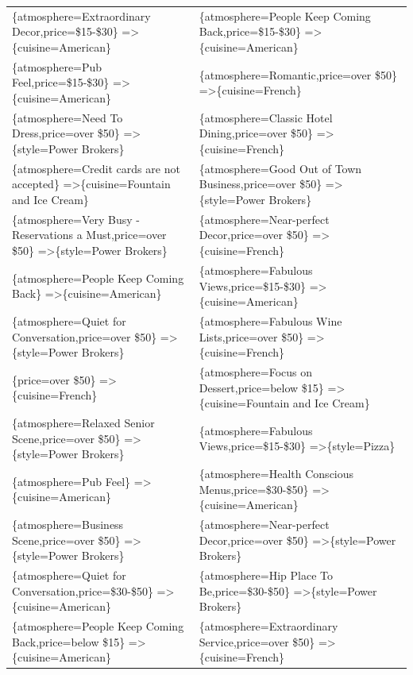 \documentclass[letterpaper,10pt]{article}
\begin{document}
\begin{appendices}
\begin{table}[h]
\begin{adjustbox}{max width=\textwidth}
\begin{tabular}{ll}
\{atmosphere=Extraordinary Decor,price=\$15-\$30\} =\textgreater \{cuisine=American\} & \{atmosphere=People Keep Coming Back,price=\$15-\$30\} =\textgreater \{cuisine=American\} \\ 
\{atmosphere=Pub Feel,price=\$15-\$30\} =\textgreater \{cuisine=American\} & \{atmosphere=Romantic,price=over \$50\} =\textgreater \{cuisine=French\} \\ 
\{atmosphere=Need To Dress,price=over \$50\} =\textgreater \{style=Power Brokers\} & \{atmosphere=Classic Hotel Dining,price=over \$50\} =\textgreater \{cuisine=French\} \\ 
\{atmosphere=Credit cards are not accepted\} =\textgreater \{cuisine=Fountain and Ice Cream\} & \{atmosphere=Good Out of Town Business,price=over \$50\} =\textgreater \{style=Power Brokers\} \\ 
\{atmosphere=Very Busy - Reservations a Must,price=over \$50\} =\textgreater \{style=Power Brokers\} & \{atmosphere=Near-perfect Decor,price=over \$50\} =\textgreater \{cuisine=French\} \\ 
\{atmosphere=People Keep Coming Back\} =\textgreater \{cuisine=American\} & \{atmosphere=Fabulous Views,price=\$15-\$30\} =\textgreater \{cuisine=American\} \\ 
\{atmosphere=Quiet for Conversation,price=over \$50\} =\textgreater \{style=Power Brokers\} & \{atmosphere=Fabulous Wine Lists,price=over \$50\} =\textgreater \{cuisine=French\} \\ 
\{price=over \$50\} =\textgreater \{cuisine=French\} & \{atmosphere=Focus on Dessert,price=below \$15\} =\textgreater \{cuisine=Fountain and Ice Cream\} \\ 
\{atmosphere=Relaxed Senior Scene,price=over \$50\} =\textgreater \{style=Power Brokers\} & \{atmosphere=Fabulous Views,price=\$15-\$30\} =\textgreater \{style=Pizza\} \\ 
\{atmosphere=Pub Feel\} =\textgreater \{cuisine=American\} & \{atmosphere=Health Conscious Menus,price=\$30-\$50\} =\textgreater \{cuisine=American\} \\ 
\{atmosphere=Business Scene,price=over \$50\} =\textgreater \{style=Power Brokers\} & \{atmosphere=Near-perfect Decor,price=over \$50\} =\textgreater \{style=Power Brokers\} \\ 
\{atmosphere=Quiet for Conversation,price=\$30-\$50\} =\textgreater \{cuisine=American\} & \{atmosphere=Hip Place To Be,price=\$30-\$50\} =\textgreater \{style=Power Brokers\} \\ 
\{atmosphere=People Keep Coming Back,price=below \$15\} =\textgreater \{cuisine=American\} & \{atmosphere=Extraordinary Service,price=over \$50\} =\textgreater \{cuisine=French\} \\ 

\end{tabular}
\end{adjustbox}
\end{table}
\end{appendices}
\end{document}
